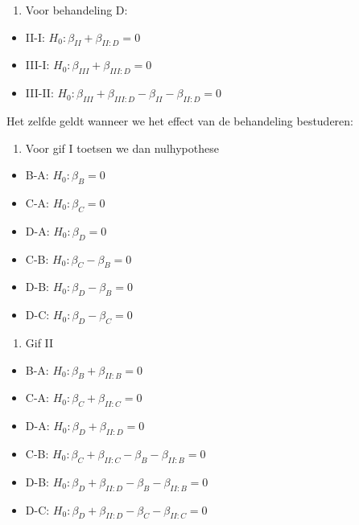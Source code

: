 \documentclass[
  12pt,dutch,coursenotes]{book}
\providecommand{\tightlist}{%
  \setlength{\itemsep}{0pt}\setlength{\parskip}{0pt}}
\theoremstyle{definition}
\theoremstyle{definition}
\theoremstyle{definition}
\theoremstyle{definition}
\theoremstyle{remark}
\begin{document}
\begin{enumerate}
\def\labelenumi{\arabic{enumi}.}
\setcounter{enumi}{3}
\tightlist
\item
  Voor behandeling D:
\end{enumerate}

\begin{itemize}
\tightlist
\item
  II-I: \(H_0: \beta_{II}+\beta_{II:D}=0\)
\item
  III-I: \(H_0: \beta_{III}+\beta_{III:D}=0\)
\item
  III-II: \(H_0: \beta_{III}+\beta_{III:D}-\beta_{II}-\beta_{II:D}=0\)
\end{itemize}

Het zelfde geldt wanneer we het effect van de behandeling bestuderen:

\begin{enumerate}
\def\labelenumi{\arabic{enumi}.}
\tightlist
\item
  Voor gif I toetsen we dan nulhypothese
\end{enumerate}

\begin{itemize}
\tightlist
\item
  B-A: \(H_0: \beta_{B}=0\)
\item
  C-A: \(H_0: \beta_{C}=0\)
\item
  D-A: \(H_0: \beta_{D}=0\)
\item
  C-B: \(H_0: \beta_{C}-\beta_{B}=0\)
\item
  D-B: \(H_0: \beta_{D}-\beta_{B}=0\)
\item
  D-C: \(H_0: \beta_{D}-\beta_{C}=0\)
\end{itemize}

\begin{enumerate}
\def\labelenumi{\arabic{enumi}.}
\setcounter{enumi}{1}
\tightlist
\item
  Gif II
\end{enumerate}

\begin{itemize}
\tightlist
\item
  B-A: \(H_0: \beta_{B}+\beta_{II:B}=0\)
\item
  C-A: \(H_0: \beta_{C}+\beta_{II:C}=0\)
\item
  D-A: \(H_0: \beta_{D}+\beta_{II:D}=0\)
\item
  C-B: \(H_0: \beta_{C}+\beta_{II:C}-\beta_{B}-\beta_{II:B}=0\)
\item
  D-B: \(H_0: \beta_{D}+\beta_{II:D}-\beta_{B}-\beta_{II:B}=0\)
\item
  D-C: \(H_0: \beta_{D}+\beta_{II:D}-\beta_{C}-\beta_{II:C}=0\)
\end{itemize}
\end{document}
